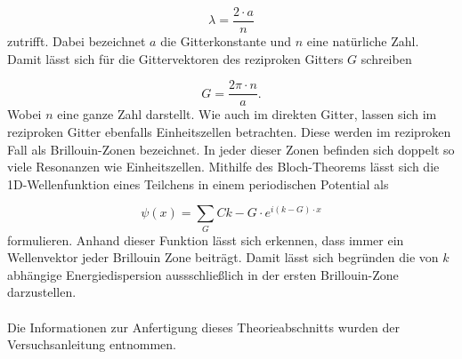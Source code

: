 \begin{equation}
  \label{eqn:e2ch4}
  \lambda = \frac{2\cdot a}{n}
\end{equation}
zutrifft. Dabei bezeichnet $a$ die Gitterkonstante und $n$ eine natürliche Zahl. Damit lässt sich für die
Gittervektoren des reziproken Gitters $G$ schreiben

\begin{equation}
  \label{eqn:e3ch4}
  G = \frac{2\pi \cdot n}{a}.
\end{equation}
Wobei $n$ eine ganze Zahl darstellt.
Wie auch im direkten Gitter, lassen sich im reziproken Gitter ebenfalls Einheitszellen betrachten. Diese
werden im reziproken Fall als Brillouin-Zonen bezeichnet. In jeder dieser Zonen befinden sich doppelt so viele
Resonanzen wie Einheitszellen. Mithilfe des Bloch-Theorems lässt sich die 1D-Wellenfunktion eines Teilchens
in einem periodischen Potential als

\begin{equation}
  \label{eqn:e4ch4}
  \psi(x) = \sum_{G} C{k-G} \cdot e^{i\left( k - G \right)\cdot x}
\end{equation}
formulieren. Anhand dieser Funktion lässt sich erkennen, dass immer ein Wellenvektor jeder Brillouin Zone
beiträgt. Damit lässt sich begründen die von $k$ abhängige Energiedispersion aussschließlich in der ersten
Brillouin-Zone darzustellen.\\ \\
Die Informationen zur Anfertigung dieses Theorieabschnitts wurden der Versuchsanleitung \cite{sample4}
entnommen.
